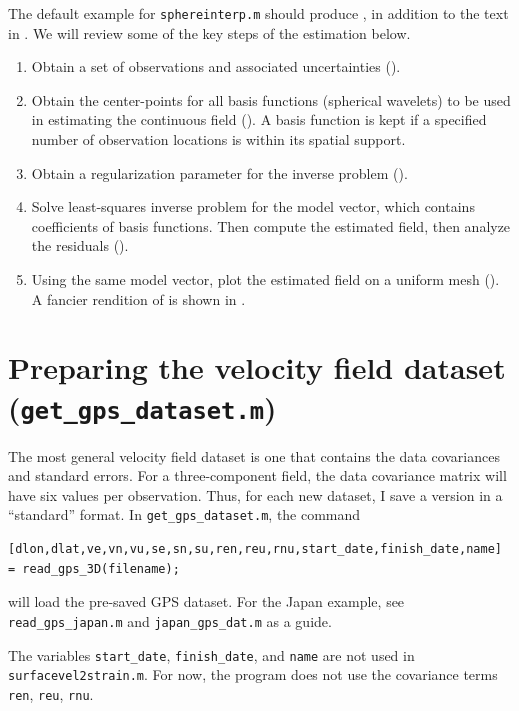 \documentclass[11pt,titlepage,fleqn]{article}
\begin{document}
The default example for \verb+sphereinterp.m+ should produce , in addition to the text in . We will review some of the key steps of the estimation below.
%
\begin{enumerate}
\item Obtain a set of observations and associated uncertainties ().
\item Obtain the center-points for all basis functions (spherical wavelets) to be used in estimating the continuous field (). A basis function is kept if a specified number of observation locations is within its spatial support.
\item Obtain a regularization parameter for the inverse problem ().
\item Solve  least-squares inverse problem for the model vector, which contains coefficients of basis functions. Then compute the estimated field, then analyze the residuals ().
\item Using the same model vector, plot the estimated field on a uniform mesh (). A fancier rendition of  is shown in .
\end{enumerate}


\section{Preparing the velocity field dataset ({\tt get\_gps\_dataset.m})}

The most general velocity field dataset is one that contains the data covariances and standard errors.  For a three-component field, the data covariance matrix will have six values per observation.  Thus, for each new dataset, I save a version in a ``standard'' format.
In \verb+get_gps_dataset.m+, the command
%
\begin{verbatim}
[dlon,dlat,ve,vn,vu,se,sn,su,ren,reu,rnu,start_date,finish_date,name] = read_gps_3D(filename);
\end{verbatim}
%
will load the pre-saved GPS dataset.  For the Japan example, see {\tt read\_gps\_japan.m} and {\tt japan\_gps\_dat.m} as a guide.

The variables \verb+start_date+, \verb+finish_date+, and \verb+name+ are not used in \verb+surfacevel2strain.m+. For now, the program does not use the covariance terms \verb+ren+, \verb+reu+, \verb+rnu+.
\end{document}
